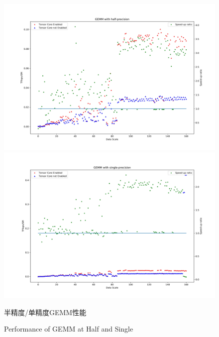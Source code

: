 \begin{figure}
	\centering
	\includegraphics[width=15cm]{figures/GEMM-Half-TF.jpg}\\
	\includegraphics[width=15cm]{figures/GEMM-Single-TF.jpg}
	\renewcommand{\thefigure}{\arabic{section}-\arabic{figure} }
	\renewcommand{\figurename}{图}
	\caption{半精度/单精度GEMM性能}
	\addtocounter{figure}{-1}
	\renewcommand{\thefigure}{\arabic{section}-\arabic{figure} }
	\renewcommand{\figurename}{Figure}
	\caption{Performance of GEMM at Half and Single}
	\label{Fig-PerfGemm}
\end{figure}
